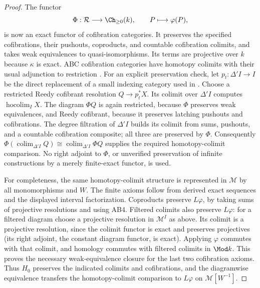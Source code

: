 \begin{proof}
The functor
\[
 \Phi:\mathcal R\longrightarrow\Ch_{\geq0}(k),\qquad P\longmapsto\varphi(P),
\]
is now an exact functor of cofibration categories. It preserves the specified cofibrations, their pushouts, coproducts, and countable cofibration colimits, and takes weak equivalences to quasi-isomorphisms. Its terms are projective over $k$ because $\kappa$ is exact. ABC cofibration categories have homotopy colimits with their usual adjunction to restriction \citep[Theorem 9.6.3]{RadulescuBanu2009}. For an explicit preservation check, let $p_t:\Delta'I\to I$ be the direct replacement of a small indexing category used in \citet[Proposition 9.5.7 and the proof of Theorem 9.6.3]{RadulescuBanu2009}. Choose a restricted Reedy cofibrant resolution $Q\to p_t^*X$. Its colimit over $\Delta'I$ computes $\operatorname{hocolim}_I X$. The diagram $\Phi Q$ is again restricted, because $\Phi$ preserves weak equivalences, and Reedy cofibrant, because it preserves latching pushouts and cofibrations. The degree filtration of $\Delta'I$ builds its colimit from sums, pushouts, and a countable cofibration composite; all three are preserved by $\Phi$. Consequently $\Phi(\operatorname{colim}_{\Delta'I}Q)\cong\operatorname{colim}_{\Delta'I}\Phi Q$ supplies the required homotopy-colimit comparison. No right adjoint to $\Phi$, or unverified preservation of infinite constructions by a merely finite-exact functor, is used.

For completeness, the same homotopy-colimit structure is represented in $\mathcal M$ by all monomorphisms and $W$. The finite axioms follow from derived exact sequences and the displayed interval factorization. Coproducts preserve $L\varphi$, by taking sums of projective resolutions and using AB4. Filtered colimits also preserve $L\varphi$: for a filtered diagram choose a projective resolution in $\mathcal M^I$ as above. Its colimit is a projective resolution, since the colimit functor is exact and preserves projectives (its right adjoint, the constant diagram functor, is exact). Applying $\varphi$ commutes with that colimit, and homology commutes with filtered colimits in $\Mod k$. This proves the necessary weak-equivalence closure for the last two cofibration axioms. Thus $H_0$ preserves the indicated colimits and cofibrations, and the diagramwise equivalence transfers the homotopy-colimit comparison to $L\varphi$ on $\mathcal M[W^{-1}]$.


\end{proof}
